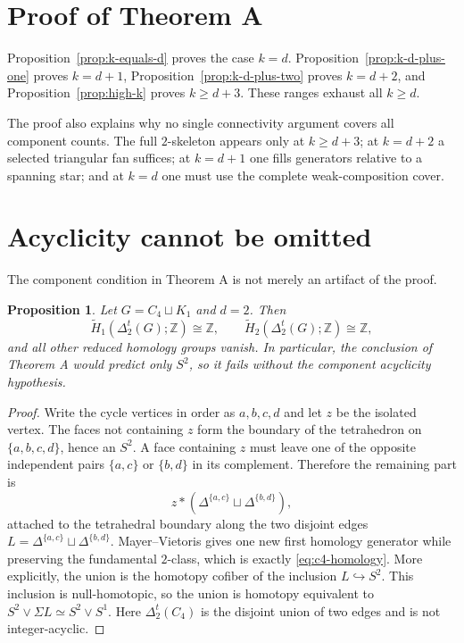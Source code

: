 \documentclass[11pt]{article}
\newtheorem{proposition}[theorem]{Proposition}
\theoremstyle{remark}
\numberwithin{equation}{section}
\begin{document}
\section{Proof of Theorem A}

Proposition~\ref{prop:k-equals-d} proves the case $k=d$.
Proposition~\ref{prop:k-d-plus-one} proves $k=d+1$,
Proposition~\ref{prop:k-d-plus-two} proves $k=d+2$, and
Proposition~\ref{prop:high-k} proves $k\geq d+3$. These ranges exhaust all
$k\geq d$.

The proof also explains why no single connectivity argument covers all
component counts. The full $2$-skeleton appears only at $k\geq d+3$; at
$k=d+2$ a selected triangular fan suffices; at $k=d+1$ one fills generators
relative to a spanning star; and at $k=d$ one must use the complete
weak-composition cover.

\section{Acyclicity cannot be omitted}\label{sec:counterexample}

The component condition in Theorem A is not merely an artifact of the proof.

\begin{proposition}\label{prop:c4-counterexample}
Let $G=C_4\sqcup K_1$ and $d=2$. Then
\begin{equation}
\widetilde H_1(\Delta_2^t(G);\mathbb Z)\cong\mathbb Z,
\qquad
\widetilde H_2(\Delta_2^t(G);\mathbb Z)\cong\mathbb Z,
\label{eq:c4-homology}
\end{equation}
and all other reduced homology groups vanish. In particular, the conclusion
of Theorem A would predict only $S^2$, so it fails without the component
acyclicity hypothesis.
\end{proposition}

\begin{proof}
Write the cycle vertices in order as $a,b,c,d$ and let $z$ be the isolated
vertex. The faces not containing $z$ form the boundary of the tetrahedron on
$\{a,b,c,d\}$, hence an $S^2$. A face containing $z$ must leave one of the
opposite independent pairs $\{a,c\}$ or $\{b,d\}$ in its complement.
Therefore the remaining part is
\[
z*(\Delta^{\{a,c\}}\sqcup\Delta^{\{b,d\}}),
\]
attached to the tetrahedral boundary along the two disjoint edges
$L=\Delta^{\{a,c\}}\sqcup\Delta^{\{b,d\}}$. Mayer--Vietoris gives one new
first homology generator while preserving the fundamental $2$-class, which
is exactly \eqref{eq:c4-homology}. More explicitly, the union is the homotopy
cofiber of the inclusion $L\hookrightarrow S^2$. This inclusion is
null-homotopic, so the union is homotopy equivalent to
$S^2\vee\Sigma L\simeq S^2\vee S^1$. Here $\Delta_2^t(C_4)$ is the disjoint
union of two edges and is not integer-acyclic.
\end{proof}
\end{document}
